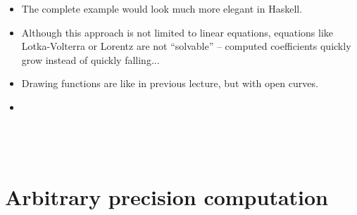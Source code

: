\documentclass{beamer}
\begin{document}
\begin{itemize}
  {}{}{\hlopt{= }}{}{\hlopt{(}}{}{}{}{\hlopt{(}}{}{\hlopt{,
  }}{}{\hlopt{))}}{\hlendline{}}\\
  {}{}{\hlopt{= }}{}{\hlopt{(}}{}{}{\hlopt{,
  }}{}{\hlopt{(}}{}{\hlopt{))}}{\hlendline{}}\\
  {}{}{\hlopt{= }}{}{\hlopt{(}}{}{}{\hlopt{,
  }}{}{\hlopt{(}}{}{\hlopt{-:}}{}{\hlopt{))}}{\hlendline{}}
  
  \item The complete example would look much more elegant in Haskell.
  
  \item Although this approach is not limited to linear equations, equations
  like Lotka-Volterra or Lorentz are not ``solvable'' -- computed coefficients
  quickly grow instead of quickly falling...
  
  \item Drawing functions are like in previous lecture, but with open curves.
  
  \item {}{}{\hlopt{=}}{\hlendline{}}\\
  {\hlstd{ \ }}{}{}{\hlopt{=
  (}}{}{}{}{}{}{}{\hlendline{}}\\
  {\hlstd{ \ }}{}{}{}{\hlopt{(}}{}{}{\hlopt{->}}{\hlendline{}}\\
  {\hlstd{ \ \ \ }}{}{}{\hlopt{= }}{}{\hlopt{(}}{}{}{}{\hlopt{) }}{}{}{\hlendline{}}\\
  {}{\hlopt{, }}{}{\hlopt{(}}{}{}{}{\hlopt{))}}{\hlendline{}}
\end{itemize}

\section{Arbitrary precision computation}
\end{document}
